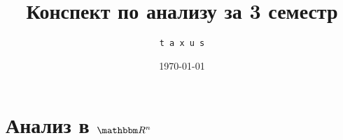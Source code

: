 \documentclass[12pt]{../notes}
\title{Конспект по анализу за 3 семестр}
\date{\today}
\author{\texttt{t a x u s}}
\begin{document}
\maketitle
\tableofcontents
\clearpage

\chapter{Анализ в \texorpdfstring{$\R^n$}{}}

\end{document}

